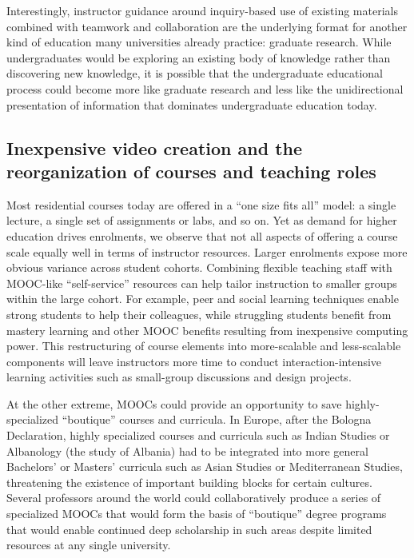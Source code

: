 Interestingly, instructor guidance around
inquiry-based use of existing materials combined with teamwork and
collaboration are the underlying format for another kind of education many
universities already practice:
graduate research.  While undergraduates would be exploring an existing
body of knowledge rather than discovering new knowledge, it is possible
that the undergraduate educational process could become more like
graduate research and less like the unidirectional presentation of information
that dominates undergraduate education today.


\subsection{Inexpensive video creation and the reorganization of courses
  and teaching roles}

Most residential courses today are offered in a ``one size fits all''
model: a single lecture, a single set of assignments or labs, and so on.
Yet as demand for higher education drives enrolments, we observe that
not all aspects of offering a course scale equally well in terms of
instructor resources.
Larger enrolments expose more obvious variance across student cohorts.
Combining flexible teaching staff with MOOC-like ``self-service''
resources can help tailor instruction to smaller groups within the large
cohort.   For example, peer and social learning techniques enable
strong students to help their colleagues, while struggling students 
benefit from mastery learning and other MOOC benefits resulting from
inexpensive computing power.
This restructuring of course elements into more-scalable and less-scalable
components
will leave instructors more time to conduct
interaction-intensive learning activities such as small-group 
discussions and design projects.

At the other extreme, MOOCs could provide an opportunity to save
highly-specialized ``boutique'' courses and curricula.
In Europe, after the Bologna Declaration, highly specialized courses and
curricula such as Indian Studies or Albanology (the study of Albania)
had to be integrated into more general Bachelors' or Masters' curricula
such as Asian Studies or Mediterranean Studies, threatening the
existence of important building blocks for certain cultures.
Several professors around the world could collaboratively produce a
series of specialized MOOCs that would form the basis of ``boutique''
degree programs that would enable continued deep scholarship in such
areas despite limited resources at any single university.

